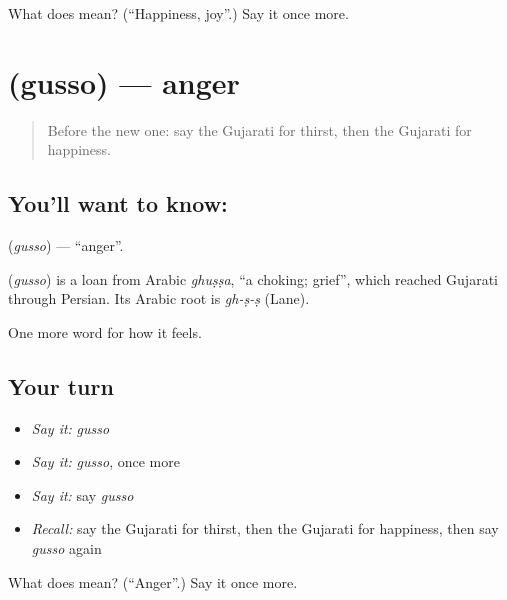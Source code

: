\begin{tcolorbox}[breakable,colback=teal!4,colframe=teal!35!black,title={Before you move on}]
What does  mean? (\textquotedblleft{}Happiness, joy\textquotedblright{}.) Say it once more.
\end{tcolorbox}
\section[\texorpdfstring{\gu{ગુસ્સો} (gusso)}{ગુસ્સો (gusso)}]{ (gusso) — anger}

\label{lesson:GU-C50-anger}



\begin{quote}
Before the new one: say the Gujarati for thirst, then the Gujarati for happiness.
\end{quote}

\subsection*{You'll want to know: }
\textbf{} (\emph{gusso}) — \textquotedblleft{}anger\textquotedblright{}.

\begin{cousinweb}
\textbf{} (\emph{gusso}) is a loan from Arabic \emph{ghuṣṣa}, \textquotedblleft{}a choking; grief\textquotedblright{}, which reached Gujarati through Persian. Its Arabic root is \emph{gh-ṣ-ṣ} (Lane).
\end{cousinweb}

\begin{grammarlens}[title={What you've built}]
One more word for how it feels.
\end{grammarlens}

\subsection*{Your turn}
\begin{itemize}
\raggedright
  \item \emph{Say it:} \emph{gusso}
  \item \emph{Say it:} \emph{gusso}, once more
  \item \emph{Say it:} say \emph{gusso}
  \item \emph{Recall:} say the Gujarati for thirst, then the Gujarati for happiness, then say \emph{gusso} again
\end{itemize}

\begin{tcolorbox}[breakable,colback=teal!4,colframe=teal!35!black,title={Before you move on}]
What does  mean? (\textquotedblleft{}Anger\textquotedblright{}.) Say it once more.
\end{tcolorbox}

